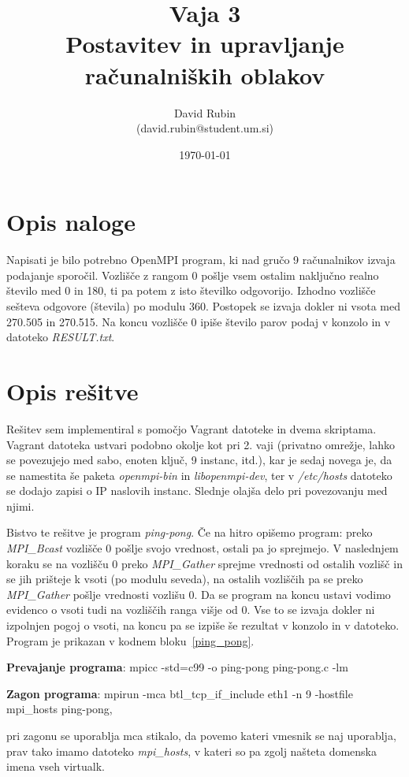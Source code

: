\documentclass[a4paper,11pt]{article}
\title{%
  Vaja 3\\
  \large Postavitev in upravljanje računalniških oblakov}
\author{David Rubin \\ (david.rubin@student.um.si)}
\date{\today}
\begin{document}
\maketitle

\section{Opis naloge}

Napisati je bilo potrebno OpenMPI program, ki nad gručo 9 računalnikov izvaja podajanje sporočil. Vozlišče z rangom 0 pošlje vsem ostalim naključno realno število med 0 in 180, ti pa potem z isto številko odgovorijo. Izhodno vozlišče sešteva odgovore (števila) po modulu 360. Postopek se izvaja dokler ni vsota med 270.505 in 270.515. Na koncu vozlišče 0 ipiše število parov podaj v konzolo in v datoteko \textit{RESULT.txt}.

\section{Opis rešitve}

Rešitev sem implementiral s pomočjo Vagrant datoteke in dvema skriptama. Vagrant datoteka ustvari podobno okolje kot pri 2. vaji (privatno omrežje, lahko se povezujejo med sabo, enoten ključ, 9 instanc, itd.), kar je sedaj novega je, da se namestita še paketa \textit{openmpi-bin} in \textit{libopenmpi-dev}, ter v \textit{/etc/hosts} datoteko se dodajo zapisi o IP naslovih instanc. Slednje olajša delo pri povezovanju med njimi.


Bistvo te rešitve je program \textit{ping-pong}. Če na hitro opišemo program: preko \textit{MPI\_Bcast} vozlišče 0 pošlje svojo vrednost, ostali pa jo sprejmejo. V naslednjem koraku se na vozlišču 0 preko \textit{MPI\_Gather} sprejme vrednosti od ostalih vozlišč in se jih prišteje k vsoti (po modulu seveda), na ostalih vozliščih pa se preko \textit{MPI\_Gather} pošlje vrednosti vozlišu 0. Da se program na koncu ustavi vodimo evidenco o vsoti tudi na vozliščih ranga višje od 0. Vse to se izvaja dokler ni izpolnjen pogoj o vsoti, na koncu pa se izpiše še rezultat v konzolo in v datoteko. Program je prikazan v kodnem bloku~\ref{ping_pong}.

\textbf{Prevajanje programa}: mpicc -std=c99 -o ping-pong ping-pong.c -lm

\textbf{Zagon programa}: mpirun -mca btl\_tcp\_if\_include eth1 -n 9 -hostfile mpi\_hosts ping-pong,

pri zagonu se uporablja mca stikalo, da povemo kateri vmesnik se naj uporablja, prav tako imamo datoteko \textit{mpi\_hosts}, v kateri so pa zgolj našteta domenska imena vseh virtualk.
\end{document}
